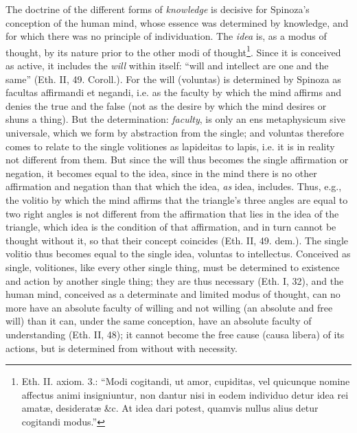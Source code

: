 \documentclass[12pt,a4paper,openany]{book}
\newcommand{\opage}[1]{\marginnote{\footnotesize\textit{[#1]}}}
\begin{document}
The doctrine of the different forms of \emph{knowledge} is decisive for
Spinoza's conception of the human mind,
\opage{105}\setcounter{footnote}{0}whose essence was determined by knowledge, and for which there was no
principle of individuation. The \emph{idea} is, as a modus of thought, by its
nature prior to the other modi of thought\footnote{Eth. II. axiom. 3.:
``Modi cogitandi, ut amor, cupiditas, vel quicunque nomine affectus
animi insigniuntur, non dantur nisi in eodem individuo detur idea
rei amatæ, desideratæ \&c. At idea dari potest, quamvis nullus alius
detur cogitandi modus.''}. Since it is conceived as active, it includes %
the \emph{will} within itself: ``will and intellect are one and the same''
(Eth. II, 49. Coroll.). For the will (voluntas) is determined by
Spinoza as facultas affirmandi et negandi, i.e. as the faculty by
which the mind affirms and denies the true and the false (not as
the desire by which the mind desires or shuns a thing). But
the determination: \emph{faculty}, is only an ens metaphysicum sive universale,
which we form by abstraction from the single; and voluntas therefore
comes to relate to the single volitiones as lapideitas
to lapis, i.e. it is in reality not different from them. But since
the will thus becomes the single affirmation or negation,
it becomes equal to the idea, since in the mind there is no other affirmation and
negation than that which the idea, \emph{as} idea, includes. Thus, e.g.,
the volitio by which the mind affirms that the triangle's three
angles are equal to two right angles is not different from the affirmation that
lies in the idea of the triangle, which idea is the condition of that
affirmation, and in turn cannot be thought without it, so that their
concept coincides (Eth. II, 49. dem.). The single volitio thus becomes
equal to the single idea, voluntas to intellectus.
Conceived as single, volitiones, like every other single
thing, must be determined to existence and action by another single thing; they
are thus necessary (Eth. I, 32), and the human mind,
conceived as a determinate and limited modus of thought, can no more
have an absolute faculty of willing and not willing (an absolute and free
will) than it can, under the same conception, have an absolute faculty
of understanding (Eth. II, 48); it cannot become the free cause
\opage{106}\setcounter{footnote}{0}(causa libera) of its actions, but is determined from without with
necessity.
\end{document}

